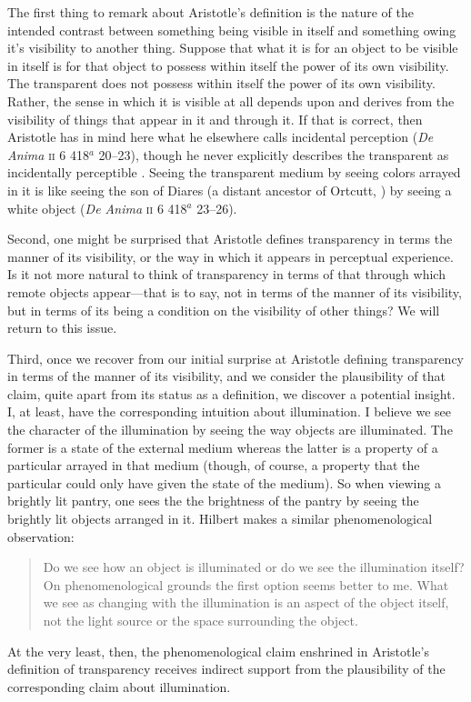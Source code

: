 The first thing to remark about Aristotle's definition is the nature of the intended contrast between something being visible in itself and something owing it's visibility to another thing. Suppose that what it is for an object to be visible in itself is for that object to possess within itself the power of its own visibility. The transparent does not possess within itself the power of its own visibility. Rather, the sense in which it is visible at all depends upon and derives from the visibility of things that appear in it and through it. If that is correct, then Aristotle has in mind here what he elsewhere calls incidental perception (\emph{De Anima} \textsc{ii} 6 418\( ^{a} \) 20--23), though he never explicitly describes the transparent as incidentally perceptible \citep[260]{Polansky:2007ly}. Seeing the transparent medium by seeing colors arrayed in it is like seeing the son of Diares (a distant ancestor of Ortcutt, \citealt{Quine:1956qp}) by seeing a white object (\emph{De Anima} \textsc{ii} 6 418\( ^{a} \) 23--26).

Second, one might be surprised that Aristotle defines transparency in terms the manner of its visibility, or the way in which it appears in perceptual experience. Is it not more natural to think of transparency in terms of that through which remote objects appear---that is to say, not in terms of the manner of its visibility, but in terms of its being a condition on the visibility of other things? We will return to this issue.

Third, once we recover from our initial surprise at Aristotle defining transparency in terms of the manner of its visibility, and we consider the plausibility of that claim, quite apart from its status as a definition, we discover a potential insight. I, at least, have the corresponding intuition about illumination. I believe we see the character of the illumination by seeing the way objects are illuminated. The former is a state of the external medium whereas the latter is a property of a particular arrayed in that medium (though, of course, a property that the particular could only have given the state of the medium). So when viewing a brightly lit pantry, one sees the the brightness of the pantry by seeing the brightly lit objects arranged in it.  Hilbert makes a similar phenomenological observation:
\begin{quote}
	Do we see how an object is illuminated or do we see the illumination itself? On phenomenological grounds the first option seems better to me. What we see as changing with the illumination is an aspect of the object itself, not the light source or the space surrounding the object. \citep[150--151]{Hilbert:2007qy}
\end{quote}
At the very least, then, the phenomenological claim enshrined in Aristotle's definition of transparency receives indirect support from the plausibility of the corresponding claim about illumination.

